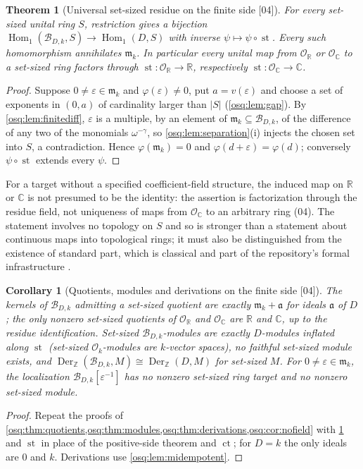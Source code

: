 \documentclass[11pt,letterpaper]{article}
\numberwithin{equation}{section}
\newtheorem{theorem}{Theorem}[section]
\newtheorem{corollary}[corollary]{Corollary}
\theoremstyle{definition}
\theoremstyle{remark}
\theoremstyle{plain}
\newcommand{\Z}{\mathbb Z}
\newcommand{\R}{\mathbb R}
\newcommand{\C}{\mathbb C}
\newcommand{\B}{\mathcal B}          %
\newcommand{\mm}{\mathfrak m}        %
\newcommand{\OO}{\mathcal O}         %
\newcommand{\ct}{\operatorname{ct}}
\newcommand{\st}{\operatorname{st}}
\newcommand{\Homone}{\operatorname{Hom}_1}
\newcommand{\Der}{\operatorname{Der}}
\newcommand{\src}[1]{\textup{\textsf{[#1]}}}
\begin{document}
\begin{theorem}[Universal set-sized residue on the finite side \src{04}]\label{osq:thm:finite}
For every set-sized unital ring $S$, restriction gives a bijection
$\Homone(\B_{D,k},S)\to\Homone(D,S)$ with inverse $\psi\mapsto\psi\circ\st$. Every such
homomorphism annihilates $\mm_k$. In particular every unital map from $\OO_\R$ or $\OO_\C$ to
a set-sized ring factors through $\st:\OO_\R\to\R$, respectively $\st:\OO_\C\to\C$.
\end{theorem}
\begin{proof}
Suppose $0\ne\varepsilon\in\mm_k$ and $\varphi(\varepsilon)\ne0$, put $a=v(\varepsilon)$
and choose a set of exponents in $(0,a)$ of cardinality larger than $|S|$
(\cref{osq:lem:gap}). By \cref{osq:lem:finitediff}, $\varepsilon$ is a multiple, by an element
of $\mm_k\subseteq\B_{D,k}$, of the difference of any two of the monomials
$\omega^{-\gamma}$, so \cref{osq:lem:separation}(i) injects the chosen set into $S$, a
contradiction. Hence $\varphi(\mm_k)=0$ and $\varphi(d+\varepsilon)=\varphi(d)$; conversely
$\psi\circ\st$ extends every $\psi$.
\end{proof}

For a target without a specified coefficient-field structure, the induced map on $\R$ or
$\C$ is not presumed to be the identity: the assertion is factorization through the residue
field, not uniqueness of maps from $\OO_\C$ to an arbitrary ring (04). The statement involves
no topology on $S$ and so is stronger than a statement about continuous maps into topological
rings; it must also be distinguished from the existence of standard part, which is classical
and part of the repository's formal infrastructure \cite{RepoBridge}.

\begin{corollary}[Quotients, modules and derivations on the finite side \src{04}]\label{osq:cor:finitequotients}
The kernels of $\B_{D,k}$ admitting a set-sized quotient are exactly $\mm_k+\mathfrak a$
for ideals $\mathfrak a$ of $D$; the only nonzero set-sized quotients of $\OO_\R$ and
$\OO_\C$ are $\R$ and $\C$, up to the residue identification. Set-sized $\B_{D,k}$-modules
are exactly $D$-modules inflated along $\st$ (set-sized $\OO_k$-modules are $k$-vector
spaces), no faithful set-sized module exists, and $\Der_\Z(\B_{D,k},M)\cong\Der_\Z(D,M)$ for
set-sized $M$. For $0\ne\varepsilon\in\mm_k$, the localization $\B_{D,k}[\varepsilon^{-1}]$
has no nonzero set-sized ring target and no nonzero set-sized module.
\end{corollary}
\begin{proof}
Repeat the proofs of \cref{osq:thm:quotients,osq:thm:modules,osq:thm:derivations,osq:cor:nofield}
with \cref{osq:thm:finite} and $\st$ in place of the positive-side theorem and $\ct$; for
$D=k$ the only ideals are $0$ and $k$. Derivations use \cref{osq:lem:midempotent}.
\end{proof}
\end{document}
